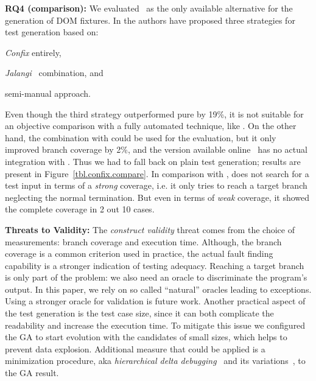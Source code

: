 \textbf{RQ4 (comparison):} We evaluated \Confix\ as the only available alternative for the generation of DOM fixtures. In \cite{amin:ase15} the authors have proposed three strategies for test generation based on:
\begin{enumerate*}[label=(\roman*)]
  \item \emph{Confix} entirely,
  \item \emph{Jalangi}~\cite{sen2013jalangi} combination, and
  \item semi-manual approach.
\end{enumerate*}
Even though the third strategy outperformed pure \Confix by 19\%, it is not suitable for an objective comparison with a fully automated technique, like \Jedi. On the other hand, the combination with \Jalangi could be used for the evaluation, but it only improved branch coverage by 2\%, and the \Confix version available online~\cite{confixgit} has no actual integration with \Jalangi. Thus we had to fall back on plain \Confix test generation; results are present in Figure~\ref{tbl.confix.compare}. In comparison with \Jedi, \Confix does not search for a test input in terms of a \emph{strong} coverage, i.e. it only tries to reach a target branch neglecting the normal termination. But even in terms of \emph{weak} coverage, it showed the complete coverage in 2 out 10 cases.\\

\textbf{Threats to Validity:}
The \emph{construct validity} threat comes from the choice of measurements: branch coverage and execution time. Although, the branch coverage is a common criterion used in practice, the actual fault finding capability is a stronger indication of testing adequacy. Reaching a target branch is only part of the problem: we also need an oracle to discriminate the program's output. In this paper, we rely on so called ``natural'' oracles leading to exceptions. Using a stronger oracle for validation is future work. Another practical aspect of the test generation is the test case size, since it can both complicate the readability and increase the execution time. To mitigate this issue we configured the GA to start evolution with the candidates of small sizes, which helps to prevent data explosion. Additional measure that could be applied is a minimization procedure, aka \emph{hierarchical delta debugging}~\cite{misherghi2006hdd} and its variations~\cite{herfert2017automatically}, to the GA result.

